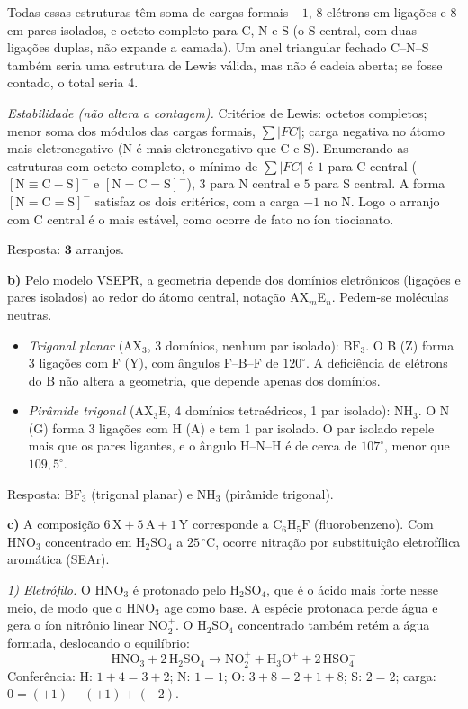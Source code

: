\documentclass{article}%
\begin{document}
\noindent Todas essas estruturas têm soma de cargas formais $-1$, 8 elétrons em ligações e 8 em pares isolados, e octeto completo para C, N e S (o S central, com duas ligações duplas, não expande a camada). Um anel triangular fechado C–N–S também seria uma estrutura de Lewis válida, mas não é cadeia aberta; se fosse contado, o total seria 4.

\noindent\emph{Estabilidade (não altera a contagem).} Critérios de Lewis: octetos completos; menor soma dos módulos das cargas formais, $\sum|FC|$; carga negativa no átomo mais eletronegativo (N é mais eletronegativo que C e S). Enumerando as estruturas com octeto completo, o mínimo de $\sum|FC|$ é $1$ para C central ($[\text{N}{\equiv}\text{C}{-}\text{S}]^{-}$ e $[\text{N}{=}\text{C}{=}\text{S}]^{-}$), $3$ para N central e $5$ para S central. A forma $[\text{N}{=}\text{C}{=}\text{S}]^{-}$ satisfaz os dois critérios, com a carga $-1$ no N. Logo o arranjo com C central é o mais estável, como ocorre de fato no íon tiocianato.

\noindent Resposta: $\mathbf{3}$ arranjos.

\medskip
\noindent\textbf{b)} Pelo modelo VSEPR, a geometria depende dos domínios eletrônicos (ligações e pares isolados) ao redor do átomo central, notação AX$_m$E$_n$. Pedem-se moléculas neutras.
\begin{itemize}
\item \textit{Trigonal planar} (AX$_3$, 3 domínios, nenhum par isolado): $\text{BF}_3$. O B (Z) forma 3 ligações com F (Y), com ângulos F–B–F de $120^\circ$. A deficiência de elétrons do B não altera a geometria, que depende apenas dos domínios.
\item \textit{Pirâmide trigonal} (AX$_3$E, 4 domínios tetraédricos, 1 par isolado): $\text{NH}_3$. O N (G) forma 3 ligações com H (A) e tem 1 par isolado. O par isolado repele mais que os pares ligantes, e o ângulo H–N–H é de cerca de $107^\circ$, menor que $109{,}5^\circ$.
\end{itemize}

\noindent Resposta: $\text{BF}_3$ (trigonal planar) e $\text{NH}_3$ (pirâmide trigonal).

\medskip
\noindent\textbf{c)} A composição $6\,\text{X}+5\,\text{A}+1\,\text{Y}$ corresponde a $\text{C}_6\text{H}_5\text{F}$ (fluorobenzeno). Com HNO$_3$ concentrado em H$_2$SO$_4$ a $25\,^\circ\text{C}$, ocorre nitração por substituição eletrofílica aromática (SEAr).

\noindent\emph{1) Eletrófilo.} O HNO$_3$ é protonado pelo H$_2$SO$_4$, que é o ácido mais forte nesse meio, de modo que o HNO$_3$ age como base. A espécie protonada perde água e gera o íon nitrônio linear $\text{NO}_2^{+}$. O H$_2$SO$_4$ concentrado também retém a água formada, deslocando o equilíbrio:
\[
\text{HNO}_3+2\,\text{H}_2\text{SO}_4\rightarrow\text{NO}_2^{+}+\text{H}_3\text{O}^{+}+2\,\text{HSO}_4^{-}
\]
Conferência: H: $1+4=3+2$; N: $1=1$; O: $3+8=2+1+8$; S: $2=2$; carga: $0=(+1)+(+1)+(-2)$.
\end{document}
